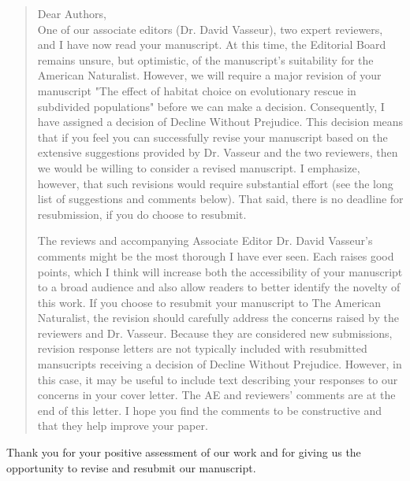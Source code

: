 \documentclass[11pt]{article}
\newenvironment{referee}{\vspace{0.cm} \sffamily \color{colreferee} \begin{quotation} }{\end{quotation} \vspace{0.cm}}
\newcommand{\lmarginpar}[1]{\reversemarginpar\marginpar{\textcolor{colreferee}{\textbf{\textsf{[#1]}}}}}
\newcommand{\addnb}[1]{\refstepcounter{numcom}\lmarginpar{\arabic{numcom}}\label{#1}}
\newcounter{numcom}
\begin{document}
\begin{referee}
Dear Authors, \addnb{editor} \vspace{-10pt}\\

One of our associate editors (Dr. David Vasseur), two expert reviewers, and I have now read your manuscript. At this time, the Editorial Board remains unsure, but optimistic, of the manuscript's suitability for the American Naturalist. However, we will require a major revision of your manuscript "The effect of habitat choice on evolutionary rescue in subdivided populations" before we can make a decision. Consequently, I have assigned a decision of Decline Without Prejudice. This decision means that if you feel you can successfully revise your manuscript based on the extensive suggestions provided by Dr. Vasseur and the two reviewers, then we would be willing to consider a revised manuscript. I emphasize, however, that such revisions would require substantial effort (see the long list of suggestions and comments below). That said, there is no deadline for resubmission, if you do choose to resubmit. 

The reviews and accompanying Associate Editor Dr. David Vasseur's comments might be the most thorough I have ever seen. Each raises good points, which I think will increase both the accessibility of your manuscript to a broad audience and also allow readers to better identify the novelty of this work. If you choose to resubmit your manuscript to The American Naturalist, the revision should carefully address the concerns raised by the reviewers and Dr. Vasseur. Because they are considered new submissions, revision response letters are not typically included with resubmitted mansucripts receiving a decision of Decline Without Prejudice. However, in this case, it may be useful to include text describing your responses to our concerns in your cover letter. The AE and reviewers’ comments are at the end of this letter. I hope you find the comments to be constructive and that they help improve your paper. 
\end{referee}
%
Thank you for your positive assessment of our work and for giving us the opportunity to revise and resubmit our manuscript. 
\end{document}
